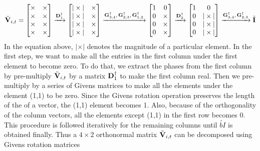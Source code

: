 \documentclass[11pt,a4paper]{report}
\def\bD{{\bf D}}
\def\bG{{\bf G}}
\def\bI{{\bf I}}
\def\bV{{\bf V}}
\begin{document}
\begin{equation}
\label{eq:example}
\tilde{\bV}_{i,t} = 
\begin{bmatrix}
\times & \times \\
\times & \times \\
\times & \times \\
\times & \times \\
\end{bmatrix}
\xrightarrow{\text{$\bD^{\dagger}_1$}}
\begin{bmatrix}
|\times| & \times \\
|\times| & \times \\
|\times| & \times \\
|\times| & \times \\
\end{bmatrix}
\xrightarrow{\text{$\bG^{\dagger}_{3,4} , \bG^{\dagger}_{2,3}, \bG^{\dagger}_{1,2}$}}
\begin{bmatrix}
1 & 0 \\
0 & \times \\
0 & \times \\
0 & \times \\
\end{bmatrix}
\xrightarrow{\text{$\bD^{\dagger}_2$}}
\begin{bmatrix}
1 & 0 \\
0 & |\times| \\
0 & |\times| \\
0 & |\times| \\
\end{bmatrix}
\xrightarrow{\text{$\bG^{\dagger}_{3,4} , \bG^{\dagger}_{2,3}$}}
\tilde{\emph{\bI}}
\end{equation}
In the equation above, $|\times|$ denotes the magnitude of a 
particular element. In the first step, we want to make all the entries
in the first column under the first element to become zero. To do that,
we extract the phases from the first column by pre-multiply $\tilde{\bV}_{i,t}$
by a matrix $\bD^{\dagger}_1$ to make the first column real. Then we pre-multiply
by a series of Givens matrices to make all the elements under the element (1,1)
to be zero. Since the Givens rotation operation preserves the length of the 
of a vector, the (1,1) element becomes 1. Also, because of the orthogonality of
the column vectors, all the elements except (1,1) in the first row
becomes 0. This procedure is followed iteratively for the remaining columns
until $\tilde{bI}$ is obtained finally. Thus a $4\times2$ orthonormal
matrix $\tilde{\bV}_{i,t}$ can be decomposed using Givens rotation matrices
\end{document}
